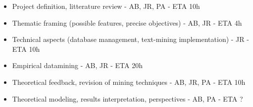\begin{itemize}
\item Project definition, litterature review - AB, JR, PA - ETA 10h
\item Thematic framing (possible features, precise objectives) - AB, JR - ETA 4h
\item Technical aspects (database management, text-mining implementation) - JR - ETA 10h
\item Empirical datamining - AB, JR - ETA 20h
\item Theoretical feedback, revision of mining techniques - AB, JR, PA - ETA 10h
\item Theoretical modeling, results interpretation, perspectives - AB, PA - ETA ?
\end{itemize}






















